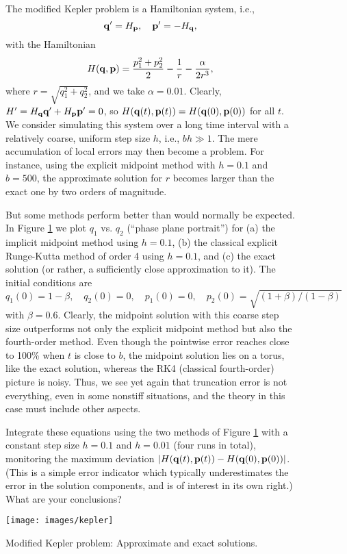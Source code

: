 \begin{figure}
  \begin{problem}[A\&P 4.19]
    The modified Kepler problem is a Hamiltonian system, i.e., 
    \[
      \mathbf{q}' = H_{\mathbf{p}}, \quad \mathbf{p}' = -H_{\mathbf{q}},
    \]
    with the Hamiltonian
    \[
      H(\mathbf{q}, \mathbf{p}) = \frac{p_1^2 + p_2^2}{2} - \frac1r - \frac{\alpha}{2r^3},
    \]
    where $r = \sqrt{q_1^2 + q_2^2}$, and we take $\alpha = 0.01$. Clearly, $H' = H_{\mathbf{q}} \mathbf{q}' + H_{\mathbf{p}} \mathbf{p}' = 0$, so $H(\mathbf{q}(t), \mathbf{p}(t)) = H(\mathbf{q}(0), \mathbf{p}(0))$ for all $t$. We consider simulating this system over a long time interval with a relatively coarse, uniform step size $h$, i.e., $bh \gg 1$. The mere accumulation of local errors may then become a problem. For instance, using the explicit midpoint method with $h = 0.1$ and $b = 500$, the approximate solution for $r$ becomes larger than the exact one by two orders of magnitude.
  
    But some methods perform better than would normally be expected. In Figure \ref{F:kepler} we plot $q_1$ vs. $q_2$ (``phase plane portrait'') for (a) the implicit midpoint method using $h = 0.1$, (b) the classical explicit Runge-Kutta method of order 4 using $h = 0.1$, and (c) the exact solution (or rather, a sufficiently close approximation to it). The initial conditions are
    \[
      q_1(0) = 1 - \beta, \quad q_2(0) = 0, \quad p_1(0) = 0, \quad p_2(0) = \sqrt{(1 + \beta)/(1 - \beta)}
    \]
    with $\beta = 0.6$. Clearly, the midpoint solution with this coarse step size outperforms not only the explicit midpoint method but also the fourth-order method. Even though the pointwise error reaches close to 100\% when $t$ is close to $b$, the midpoint solution lies on a torus, like the exact solution, whereas the RK4 (classical fourth-order) picture is noisy. Thus, we see yet again that truncation error is not everything, even in some nonstiff situations, and the theory in this case must include other aspects.
  
    Integrate these equations using the two methods of Figure \ref{F:kepler} with a constant step size $h = 0.1$ and $h = 0.01$ (four runs in total), monitoring the maximum deviation $|H(\mathbf{q}(t), \mathbf{p}(t)) - H( \mathbf{q}(0),\mathbf{p}(0))|$. (This is a simple error indicator which typically underestimates the error in the solution components, and is of interest in its own right.) What are your conclusions?
    
    \centering
    \texttt{[image: images/kepler]}
    \caption{Modified Kepler problem: Approximate and exact solutions.}
    \label{F:kepler}
  \end{problem}
\end{figure}

